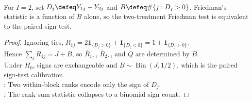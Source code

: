 \begin{corollary} \label{cor:friedman-two-treatments-sign-test} \\
For $I=2$, set $D_j\defeq Y_{1j}-Y_{2j}$ and $B\defeq\#\{j:D_j>0\}$. Friedman's statistic is a function of $B$ alone, so the two-treatment Friedman test is equivalent to the paired sign test.
\begin{proof} Ignoring ties, $R_{1j}=2\mathbf{1}_{\{D_j>0\}}+\mathbf{1}_{\{D_j<0\}}=1+\mathbf{1}_{\{D_j>0\}}$.\\
Hence $\sum_jR_{1j}=J+B$, so $\overline{R}_{1\cdot}$, $\overline{R}_{2\cdot}$, and $Q$ are determined by $B$.\\
Under $H_0$, signs are exchangeable and $B\sim\operatorname{Bin}(J,1/2)$, which is the paired sign-test calibration.\\
: Two within-block ranks encode only the sign of $D_j$.\\
: The rank-sum statistic collapses to a binomial sign count.
\end{proof}
\end{corollary}
